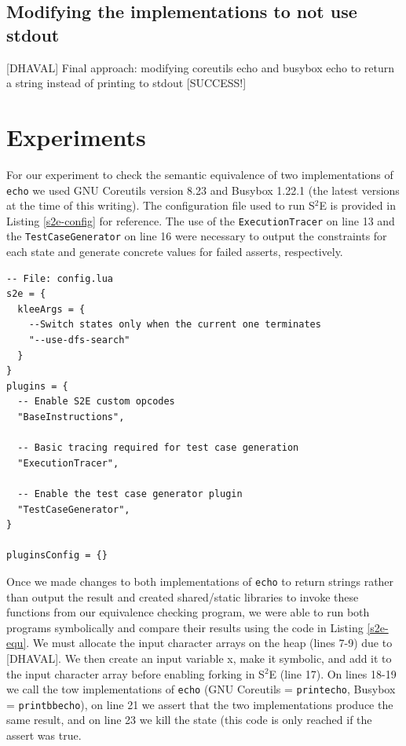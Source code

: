 \documentclass[conference]{IEEEtran}
\begin{document}
\subsection{Modifying the implementations to not use stdout}
[DHAVAL] Final approach: modifying coreutils echo and busybox echo to return a string instead of printing to stdout [SUCCESS!]


\section{Experiments}

For our experiment to check the semantic equivalence of two implementations of {\tt echo} we used GNU Coreutils version 8.23 and Busybox 1.22.1 (the latest versions at the time of this writing). The configuration file used to run S$^2$E is provided in Listing \ref{s2e-config} for reference. The use of the {\tt ExecutionTracer} on line 13 and the {\tt TestCaseGenerator} on line 16 were necessary to output the constraints for each state and generate concrete values for failed asserts, respectively. \\

\begin{lstlisting}[style=Lua, label=s2e-config, abovecaptionskip=2ex, captionpos=b, caption={S$^2$E configuration file used for experiment}]
-- File: config.lua
s2e = {
  kleeArgs = {
    --Switch states only when the current one terminates
    "--use-dfs-search"
  }
}
plugins = {
  -- Enable S2E custom opcodes
  "BaseInstructions",

  -- Basic tracing required for test case generation
  "ExecutionTracer",

  -- Enable the test case generator plugin
  "TestCaseGenerator",
}

pluginsConfig = {}
\end{lstlisting}

Once we made changes to both implementations of {\tt echo} to return strings rather than output the result and created shared/static libraries to invoke these functions from our equivalence checking program, we were able to run both programs symbolically and compare their results using the code in Listing \ref{s2e-equ}. We must allocate the input character arrays on the heap (lines 7-9) due to [DHAVAL]. We then create an input variable x, make it symbolic, and add it to the input character array before enabling forking in S$^2$E (line 17). On lines 18-19 we call the tow implementations of {\tt echo} (GNU Coreutils = {\tt printecho}, Busybox = {\tt printbbecho}), on line 21 we assert that the two implementations produce the same result, and on line 23 we kill the state (this code is only reached if the assert was true. \\
\end{document}
